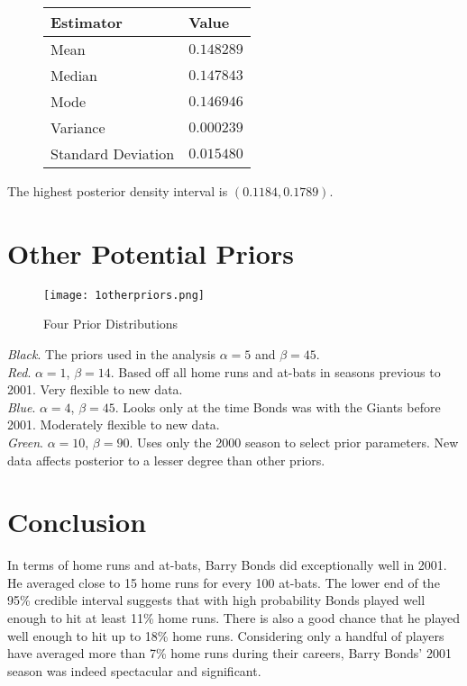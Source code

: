 \documentclass[12pt]{article}
\begin{document}
\begin{figure}[H]
\begin{center}
\begin{tabular}{l|r}
Estimator & \multicolumn{1}{l}{Value} \\ \hline \hline
Mean & $0.148289$ \\
Median & $0.147843$ \\
Mode & $0.146946$ \\
Variance & $0.000239$ \\
Standard Deviation & $0.015480$ \\
\end{tabular}
\end{center}
\end{figure}

\noindent The highest posterior density interval is $(0.1184, 0.1789)$.

\section*{Other Potential Priors}


\begin{figure}[H]
\begin{center}
\texttt{[image: 1otherpriors.png]}
\caption{Four Prior Distributions}
\end{center}
\end{figure}

\noindent \textit{Black}.  The priors used in the analysis $\alpha=5$ and $\beta=45$. \\ [-0.3cm]

\noindent \textit{Red}. $\alpha=1$, $\beta=14$.  Based off all home runs and at-bats in seasons previous to 2001.  Very flexible to new data. \\ [-0.3cm]

\noindent \textit{Blue}. $\alpha=4$, $\beta=45$.  Looks only at the time Bonds was with the Giants before 2001.  Moderately flexible to new data. \\ [-0.3cm]

\noindent \textit{Green}. $\alpha=10$, $\beta=90$.  Uses only the 2000 season to select prior parameters.  New data affects posterior to a lesser degree than other priors.

\section*{Conclusion}

In terms of home runs and at-bats, Barry Bonds did exceptionally well in 2001.  He averaged close to 15 home runs for every 100 at-bats.  The lower end of the 95\% credible interval suggests that with high probability Bonds played well enough to hit at least 11\% home runs.  There is also a good chance that he played well enough to hit up to 18\% home runs.  Considering only a handful of players have averaged more than 7\% home runs during their careers, Barry Bonds' 2001 season was indeed spectacular and significant.
\end{document}
